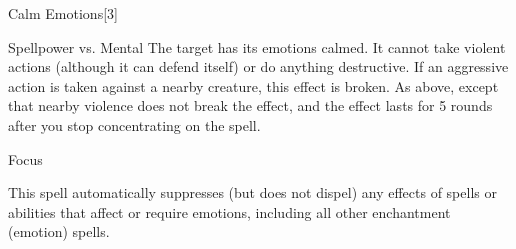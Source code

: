 \begin{spellsection}{Calm Emotions}[3]
    \begin{spellheader}
    \end{spellheader}
    \begin{spellcontent}
        \begin{spelltargetinginfo}
        \end{spelltargetinginfo}
        \begin{spelleffects}
            \begin{spellattack}{Spellpower vs. Mental}
                \spellsuccess The target has its emotions calmed. It cannot take violent actions (although it can defend itself) or do anything destructive.
                If an aggressive action is taken against a nearby creature, this effect is broken.
                \spellcritical As above, except that nearby violence does not break the effect, and the effect lasts for 5 rounds after you stop concentrating on the spell.
            \end{spellattack}
            \spelldur Focus
        \end{spelleffects}
    \end{spellcontent}
    \begin{spellfooter}
        \spellnotes This spell automatically suppresses (but does not dispel) any effects of spells or abilities that affect or require emotions, including all other enchantment (emotion) spells.
        \miscastyou
    \end{spellfooter}
\end{spellsection}

